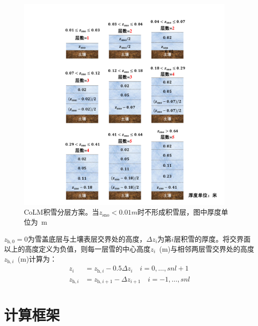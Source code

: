 {
  \begin{figure}[htbp]
    \centering
    \includegraphics[width=0.95\textwidth]{CoLM-Latex/Figures/模式构架/积雪分层.pdf}
    \caption[CoLM积雪分层方案]{CoLM积雪分层方案。当$z_{\mathrm{sno}}<0.01 \unit{m}$时不形成积雪层，图中厚度单位为~\unit{m}}
    \label{fig:积雪分层}
  \end{figure}
}

$z_{\mathrm{h,0}}=0$为雪盖底层与土壤表层交界处的高度，$\Delta z_{i}$为第$i$层积雪的厚度。将交界面以上的高度定义为负值，则每一层雪的中心高度$z_i$~(m)与相邻两层雪交界处的高度$z_{\mathrm{h},i}$~(m)计算为：
\begin{equation}
  \begin{aligned}
    z_{i} &= z_{\mathrm{h},i}-0.5 \Delta z_{i} \quad i=0, \ldots, snl+1 \\
    z_{\mathrm{h},i} &= z_{\mathrm{h}, i+1}-\Delta z_{i+1}  \quad i=-1, \ldots, snl
  \end{aligned}
\end{equation}


\section{计算框架}\label{计算框架}

